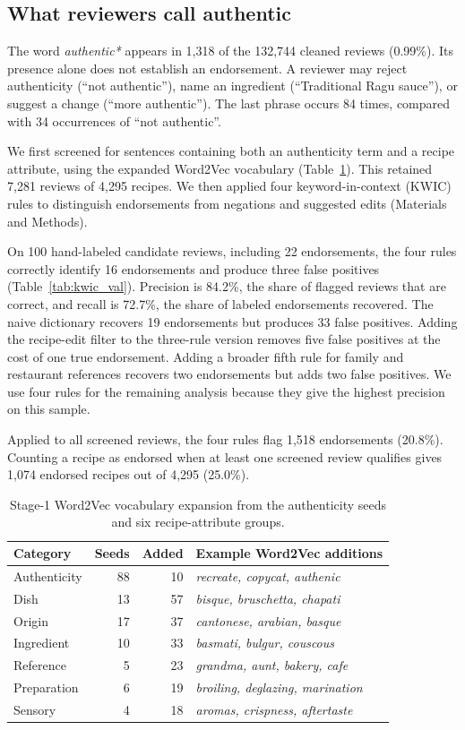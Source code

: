 \subsection*{What reviewers call authentic}
The word \emph{authentic*} appears in 1,318 of the 132,744 cleaned reviews (0.99\%). Its presence alone does not establish an endorsement. A reviewer may reject authenticity (``not authentic''), name an ingredient (``Traditional Ragu sauce''), or suggest a change (``more authentic''). The last phrase occurs 84 times, compared with 34 occurrences of ``not authentic''.

We first screened for sentences containing both an authenticity term and a recipe attribute, using the expanded Word2Vec vocabulary (Table~\ref{tab:w2v_lexicon}). This retained 7,281 reviews of 4,295 recipes. We then applied four keyword-in-context (KWIC) rules to distinguish endorsements from negations and suggested edits (Materials and Methods).

On 100 hand-labeled candidate reviews, including 22 endorsements, the four rules correctly identify 16 endorsements and produce three false positives (Table~\ref{tab:kwic_val}). Precision is 84.2\%, the share of flagged reviews that are correct, and recall is 72.7\%, the share of labeled endorsements recovered. The naive dictionary recovers 19 endorsements but produces 33 false positives. Adding the recipe-edit filter to the three-rule version removes five false positives at the cost of one true endorsement. Adding a broader fifth rule for family and restaurant references recovers two endorsements but adds two false positives. We use four rules for the remaining analysis because they give the highest precision on this sample.

Applied to all screened reviews, the four rules flag 1,518 endorsements (20.8\%). Counting a recipe as endorsed when at least one screened review qualifies gives 1,074 endorsed recipes out of 4,295 (25.0\%).

\begin{table}[tbhp]
\centering
\caption{Stage-1 Word2Vec vocabulary expansion from the authenticity seeds and six recipe-attribute groups.}
\label{tab:w2v_lexicon}
\setlength{\tabcolsep}{3.5pt}
\begin{tabular}{lrrl}
Category & Seeds & Added & Example Word2Vec additions \\
\midrule
Authenticity & 88 & 10 & \emph{recreate, copycat, authenic} \\
Dish & 13 & 57 & \emph{bisque, bruschetta, chapati} \\
Origin & 17 & 37 & \emph{cantonese, arabian, basque} \\
Ingredient & 10 & 33 & \emph{basmati, bulgur, couscous} \\
Reference & 5 & 23 & \emph{grandma, aunt, bakery, cafe} \\
Preparation & 6 & 19 & \emph{broiling, deglazing, marination} \\
Sensory & 4 & 18 & \emph{aromas, crispness, aftertaste} \\
\bottomrule
\end{tabular}
\end{table}

